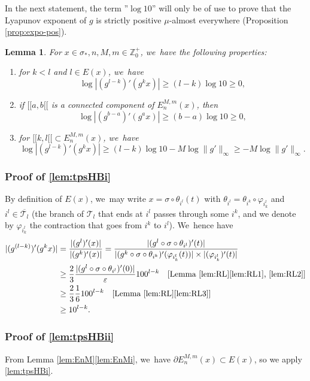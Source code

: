 \documentclass[JEP,XML,SOM,Unicode,NoFloatCountersInSection,published]{cedram}
\newenvironment{enumeratei}
{\bgroup\def\theenumi{\roman{enumi}}\def\theenumii{\arabic{enumii}}\begin{enumerate}}
{\end{enumerate}\egroup}
\newtheorem{lem}[thm]{Lemma}
\theoremstyle{definition}
\newcommand{\bbZ}{{\mathbb{Z}}}
\begin{document}
In the next statement, the term ''$\log 10$'' will only be of use to prove that the Lyapunov exponent of $g$ is strictly positive $\mu$-almost everywhere (Proposition \ref{prop:expo-pos}).

\pagebreak[2]
\begin{lem}
\label{lem:tpsHB}
For $x \in \sigma_*, n, M,m \in \bbZ_0^+$, we~have the following properties:
\begin{enumeratei}
\item\label{lem:tpsHBi}
 for $k < l$ and $l \in E(x)$, we~have
\[
\log |(g^{l-k})'(g^k x)| \geq (l-k) \log 10 \geq 0,
\]
\item\label{lem:tpsHBii}
 if $[\![ a, b [\![$ is a connected component of $E_n^{M,m}(x)$, then
\[
\log |(g^{b-a})'(g^a x)| \geq (b-a) \log 10 \geq 0,
\]
\item\label{lem:tpsHBiii}
 for $[\![ k, l [\![ \subset E_n^{M,m}(x)$, we~have
\[
\log |(g^{l-k})'(g^k x)| \geq (l-k) \log 10 - M \log \| g' \|_{\infty} \geq - M \log \| g' \|_{\infty}.
\]
\end{enumeratei}
\end{lem}

\subsubsection*{Proof of \eqref{lem:tpsHBi}}
By definition of $E(x)$, we~may write $x = \sigma \circ \theta_{i^l}(t)$ with $\theta_{i^l} = \theta_{i^k} \circ \varphi_{i_k^l}$ and $i^l \in \overline{\mathcal{T}_l}$ (\ie the branch of $\mathcal{T}_l$ that ends at $i^l$ passes through some $i^k$, and we denote by $\varphi_{i_k^l}$ the contraction that goes from $i^k$ to $i^l$). We~hence have
\begin{align*}
|(g^{(l-k)})'(g^k x) | &= \frac{| (g^l)'(x) |}{| (g^k)'(x) |} = \frac{| (g^l \circ \sigma \circ \theta_{i^l})'(t) |}{| (g^k \circ \sigma \circ \theta_{i^k})'(\varphi_{i_k^l}(t)) | \times | (\varphi_{i_k^l})'(t) |}\\
&\geq \frac{2}{3} \frac{| (g^l \circ \sigma \circ \theta_{i^l})'(0) |}{\varepsilon} 100^{l-k}\quad[\text{Lemma~\ref{lem:RL}\eqref{lem:RL1}, \eqref{lem:RL2}}]\\
&\geq \frac{2}{3} \frac{1}{6} 100^{l-k}\quad[\text{Lemma~\ref{lem:RL}\eqref{lem:RL3}}]\\
&\geq 10^{l-k}.
\end{align*}

\subsubsection*{Proof of \eqref{lem:tpsHBii}}
From Lemma \ref{lem:EnM}\eqref{lem:EnMi}, we~have $\partial E_n^{M,m}(x) \subset E(x)$, so we apply \eqref{lem:tpsHBi}.
\end{document}
